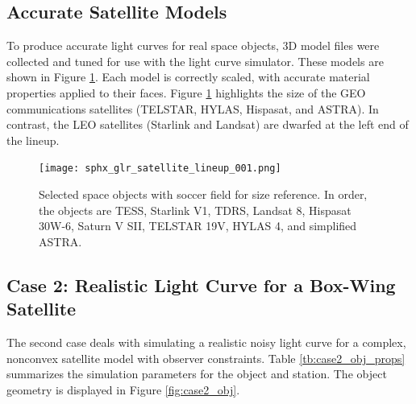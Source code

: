 \subsection{Accurate Satellite Models}

To produce accurate light curves for real space objects, 3D model files were collected and tuned for use with the light curve simulator. These models are shown in Figure \ref{fig:satellite_lineup}. Each model is correctly scaled, with accurate material properties applied to their faces. Figure \ref{fig:satellite_lineup} highlights the size of the GEO communications satellites (TELSTAR, HYLAS, Hispasat, and ASTRA). In contrast, the LEO satellites (Starlink and Landsat) are dwarfed at the left end of the lineup.

\begin{figure}[ht]
    \centering
    \texttt{[image: sphx\_glr\_satellite\_lineup\_001.png]}
    \caption{Selected space objects with soccer field for size reference. In order, the objects are TESS, Starlink V1, TDRS, Landsat 8, Hispasat 30W-6, Saturn V SII, TELSTAR 19V, HYLAS 4, and simplified ASTRA.
    }
    \label{fig:satellite_lineup}
\end{figure}

\subsection{Case 2: Realistic Light Curve for a Box-Wing Satellite} \label{sec:case2}

The second case deals with simulating a realistic noisy light curve for a complex, nonconvex satellite model with observer constraints. Table \ref{tb:case2_obj_props} summarizes the simulation parameters for the object and station. The object geometry is displayed in Figure \ref{fig:case2_obj}.

